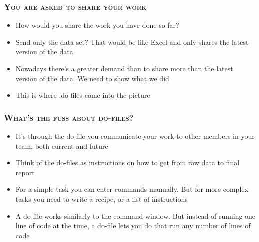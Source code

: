 \documentclass[10pt]{beamer}
\begin{document}
	\begin{frame}
		\frametitle{\textsc{You are asked to share your work}}

		\begin{itemize}
			\item How would you share the work you have done so far?
			\item Send only the data set? That would be like Excel and only shares the latest version of the data
			\item Nowadays there's a greater demand than to share more than the latest version of the data. We need to show what we did
			\item This is where .do files come into the picture

		\end{itemize}
	\end{frame}

		\begin{frame}
			\frametitle{\textsc{What's the fuss about do-files?}}
			
			\begin{itemize}
				\item It's through the do-file you communicate your work to other members in your team, both current and future
				\item Think of the do-files as instructions on how to get from raw data to final report
				\item For a simple task you can enter commands manually. But for more complex tasks you need to write a recipe, or a list of instructions
				\item A do-file works similarly to the command window. But instead of running one line of code at the time, a do-file lets you do that run any number of lines of code

				
				\end{itemize}
			\end{frame}
			
\end{document}
